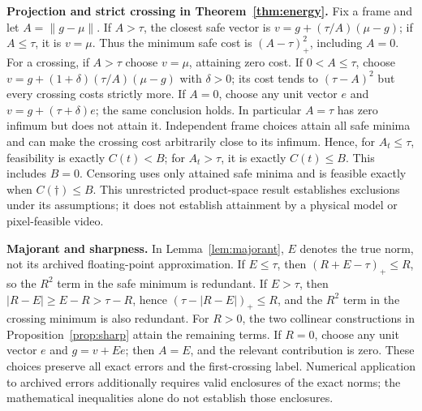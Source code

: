 \documentclass[11pt]{article}
\theoremstyle{noteplain}
\newcommand{\norm}[1]{\lVert #1\rVert}
\newcommand{\dd}{\dagger}
\begin{document}
\textbf{Projection and strict crossing in Theorem~\ref{thm:energy}.} Fix a frame and let $A=\norm{g-\mu}$. If $A>\tau$, the closest safe vector is $v=g+(\tau/A)(\mu-g)$; if $A\le\tau$, it is $v=\mu$. Thus the minimum safe cost is $(A-\tau)_+^2$, including $A=0$. For a crossing, if $A>\tau$ choose $v=\mu$, attaining zero cost. If $0<A\le\tau$, choose $v=g+(1+\delta)(\tau/A)(\mu-g)$ with $\delta>0$; its cost tends to $(\tau-A)^2$ but every crossing costs strictly more. If $A=0$, choose any unit vector $e$ and $v=g+(\tau+\delta)e$; the same conclusion holds. In particular $A=\tau$ has zero infimum but does not attain it. Independent frame choices attain all safe minima and can make the crossing cost arbitrarily close to its infimum. Hence, for $A_t\le\tau$, feasibility is exactly $C(t)<B$; for $A_t>\tau$, it is exactly $C(t)\le B$. This includes $B=0$. Censoring uses only attained safe minima and is feasible exactly when $C(\dd)\le B$. This unrestricted product-space result establishes exclusions under its assumptions; it does not establish attainment by a physical model or pixel-feasible video.

\textbf{Majorant and sharpness.} In Lemma~\ref{lem:majorant}, $E$ denotes the true norm, not its archived floating-point approximation. If $E\le\tau$, then $(R+E-\tau)_+\le R$, so the $R^2$ term in the safe minimum is redundant. If $E>\tau$, then $|R-E|\ge E-R>\tau-R$, hence $(\tau-|R-E|)_+\le R$, and the $R^2$ term in the crossing minimum is also redundant. For $R>0$, the two collinear constructions in Proposition~\ref{prop:sharp} attain the remaining terms. If $R=0$, choose any unit vector $e$ and $g=v+Ee$; then $A=E$, and the relevant contribution is zero. These choices preserve all exact errors and the first-crossing label. Numerical application to archived errors additionally requires valid enclosures of the exact norms; the mathematical inequalities alone do not establish those enclosures.
\end{document}

